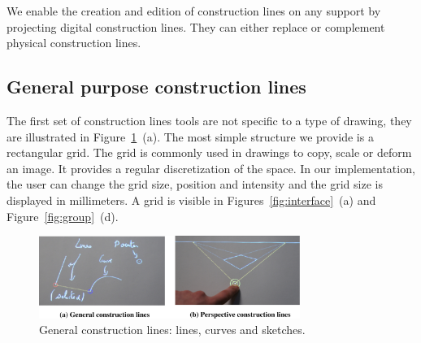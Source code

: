 \documentclass{sigchi}
\begin{document}
  
  We enable the creation and edition of construction lines on any support by
  projecting digital construction lines. They can either replace or
  complement physical construction lines. 


  

  \subsection{General purpose construction lines}

    The first set of construction lines tools are not specific to a
    type of drawing, they are illustrated in
    Figure~\ref{fig:line}~(a). The most simple structure we provide is a
    rectangular grid. 
    The grid is commonly used in drawings to copy, scale or deform an
    image. It provides a regular discretization of the space.
    In our implementation, the user can change the grid size, position
    and intensity and the grid size is displayed in millimeters. A
    grid is visible in Figures~\ref{fig:interface}~(a) and Figure~\ref{fig:group}~(d).

    \begin{figure}[!b]
      \centering 
      \includegraphics[width=85mm]{constructionline.pdf}
      \caption{General construction lines: lines, curves and sketches.}
      \label{fig:line}
    \end{figure} 
\end{document}
